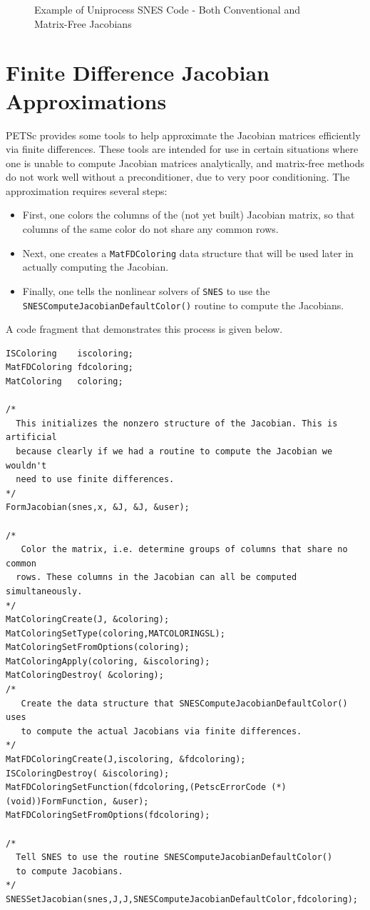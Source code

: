 \begin{figure}[H]

\caption{Example of Uniprocess SNES Code - Both Conventional and Matrix-Free Jacobians}
\label{fig_snesexample2}
\end{figure}

\section{Finite Difference Jacobian Approximations}
\label{sec_fdmatrix}

PETSc provides some tools to help approximate the Jacobian matrices efficiently via
finite differences.  These tools are intended for use in certain situations where
one is unable to compute Jacobian matrices analytically, and matrix-free methods
do not work well without a preconditioner, due to very poor conditioning.
The approximation requires several steps:
\begin{itemize}
\item First, one colors the columns of the (not yet built) Jacobian matrix, so that
      columns of the same color do not share any common rows.
\item Next, one creates a \lstinline{MatFDColoring} data structure that will be used later in
      actually computing the Jacobian.
\item Finally, one tells the nonlinear solvers of \lstinline{SNES} to use the
      \lstinline{SNESComputeJacobianDefaultColor()}
      routine to compute the Jacobians.
\end{itemize}
A code fragment that demonstrates this process is given below.
\begin{lstlisting}
ISColoring    iscoloring;
MatFDColoring fdcoloring;
MatColoring   coloring;

/*
  This initializes the nonzero structure of the Jacobian. This is artificial
  because clearly if we had a routine to compute the Jacobian we wouldn't
  need to use finite differences.
*/
FormJacobian(snes,x, &J, &J, &user);

/*
   Color the matrix, i.e. determine groups of columns that share no common
  rows. These columns in the Jacobian can all be computed simultaneously.
*/
MatColoringCreate(J, &coloring);
MatColoringSetType(coloring,MATCOLORINGSL);
MatColoringSetFromOptions(coloring);
MatColoringApply(coloring, &iscoloring);
MatColoringDestroy( &coloring);
/*
   Create the data structure that SNESComputeJacobianDefaultColor() uses
   to compute the actual Jacobians via finite differences.
*/
MatFDColoringCreate(J,iscoloring, &fdcoloring);
ISColoringDestroy( &iscoloring);
MatFDColoringSetFunction(fdcoloring,(PetscErrorCode (*)(void))FormFunction, &user);
MatFDColoringSetFromOptions(fdcoloring);

/*
  Tell SNES to use the routine SNESComputeJacobianDefaultColor()
  to compute Jacobians.
*/
SNESSetJacobian(snes,J,J,SNESComputeJacobianDefaultColor,fdcoloring);

\end{lstlisting}

